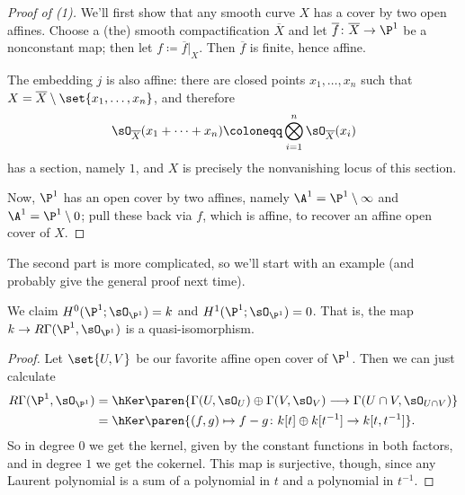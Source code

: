 \begin{proof}[Proof of (1)]
We'll first show that any smooth curve $X$ has a cover by two open affines. Choose a (the) smooth compactification $\overline X$ and let $\overline f\colon \overline X\to\P^1$ be a nonconstant map; then let $f\coloneqq \overline f|_{X}$. Then $\overline f$ is finite, hence affine.

The embedding $j$ is also affine: there are closed points $x_1,\dotsc,x_n$ such that $X = \overline X\setminus\set{x_1,\dotsc,x_n}$, and therefore
\begin{equation}
    \sO_{\overline X}(x_1 + \dotsb + x_n)\coloneqq\bigotimes_{i=1}^n \sO_{\overline X}(x_i)
\end{equation}
has a section, namely $1$, and $X$ is precisely the nonvanishing locus of this section.

Now, $\P^1$ has an open cover by two affines, namely $\A^1 = \P^1\setminus\infty$ and $\A^1 = \P^1\setminus 0$; pull these back via $f$, which is affine, to recover an affine open cover of $X$.
\end{proof}
The second part is more complicated, so we'll start with an example (and probably give the general proof next time).
\begin{prop}
We claim $H^0(\P^1;\sO_{\P^1}) = k$ and $H^1(\P^1;\sO_{\P^1}) = 0$. That is, the map $k\to R\Gamma(\P^1,\sO_{\P^1})$ is a quasi-isomorphism.
\end{prop}
\begin{proof}
Let $\set{U, V}$ be our favorite affine open cover of $\P^1$. Then we can just calculate
\begin{equation}
\begin{aligned}
    R\Gamma(\P^1,\sO_{\P^1}) &= \hKer\paren{\Gamma(U,\sO_U)\oplus\Gamma(V, \sO_V)\longrightarrow \Gamma(U\cap V,\sO_{U\cap V})}\\
    &= \hKer\paren{(f,g)\mapsto f-g\colon k[t]\oplus k[t^{-1}]\to k[t,t^{-1}]}.
\end{aligned}
\end{equation}
So in degree $0$ we get the kernel, given by the constant functions in both factors, and in degree $1$ we get the cokernel. This map is surjective, though, since any Laurent polynomial is a sum of a polynomial in $t$ and a polynomial in $t^{-1}$.
\end{proof}
